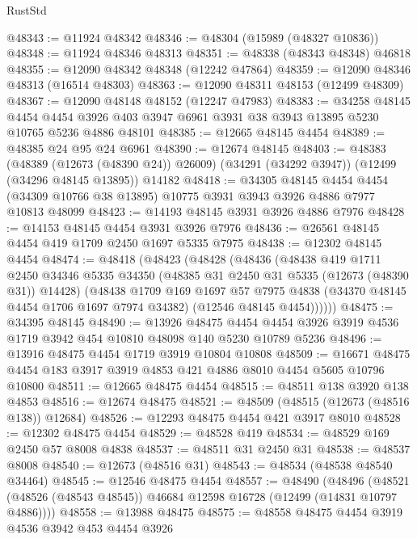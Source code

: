 \begin{lexlean}{RustStd}
\begin{coremodule}
@48343 := @11924 @48342
@48346 := @48304 (@15989 (@48327 @10836))
@48348 := @11924 @48346 @48313
@48351 := @48338 (@48343 @48348) @46818
@48355 := @12090 @48342 @48348 (@12242 @47864)
@48359 := @12090 @48346 @48313 (@16514 @48303)
@48363 := @12090 @48311 @48153 (@12499 @48309)
@48367 := @12090 @48148 @48152 (@12247 @47983)
@48383 := @34258
    @48145
    @4454
    @4454
    @3926
    @403
    @3947
    @6961
    @3931
    @38
    @3943
    @13895
    @5230
    @10765
    @5236
    @4886
    @48101
@48385 := @12665 @48145 @4454
@48389 := @48385 @24 @95 @24 @6961
@48390 := @12674 @48145
@48403 := @48383
    (@48389 (@12673 (@48390 @24)) @26009)
    (@34291 (@34292 @3947))
    (@12499 (@34296 @48145 @13895))
    @14182
@48418 := @34305
    @48145
    @4454
    @4454
    (@34309 @10766 @38 @13895)
    @10775
    @3931
    @3943
    @3926
    @4886
    @7977
    @10813
    @48099
@48423 := @14193 @48145 @3931 @3926 @4886 @7976
@48428 := @14153 @48145 @4454 @3931 @3926 @7976
@48436 := @26561 @48145 @4454 @419 @1709 @2450 @1697 @5335 @7975
@48438 := @12302 @48145 @4454
@48474 := @48418
    (@48423
      (@48428
        (@48436
          (@48438
            @419
            @1711
            @2450
            @34346
            @5335
            @34350
            (@48385 @31 @2450 @31 @5335 (@12673 (@48390 @31)) @14428)
            (@48438
              @1709
              @169
              @1697
              @57
              @7975
              @4838
              (@34370 @48145 @4454 @1706 @1697 @7974 @34382)
              (@12546 @48145 @4454))))))
@48475 := @34395 @48145
@48490 := @13926
    @48475
    @4454
    @4454
    @3926
    @3919
    @4536
    @1719
    @3942
    @454
    @10810
    @48098
    @140
    @5230
    @10789
    @5236
@48496 := @13916 @48475 @4454 @1719 @3919 @10804 @10808
@48509 := @16671 @48475 @4454 @183 @3917 @3919 @4853 @421 @4886 @8010 @4454 @5605 @10796 @10800
@48511 := @12665 @48475 @4454
@48515 := @48511 @138 @3920 @138 @4853
@48516 := @12674 @48475
@48521 := @48509 (@48515 (@12673 (@48516 @138)) @12684)
@48526 := @12293 @48475 @4454 @421 @3917 @8010
@48528 := @12302 @48475 @4454
@48529 := @48528 @419
@48534 := @48529 @169 @2450 @57 @8008 @4838
@48537 := @48511 @31 @2450 @31
@48538 := @48537 @8008
@48540 := @12673 (@48516 @31)
@48543 := @48534 (@48538 @48540 @34464)
@48545 := @12546 @48475 @4454
@48557 := @48490
    (@48496 (@48521 (@48526 (@48543 @48545)) @46684 @12598 @16728 (@12499 (@14831 @10797 @4886))))
@48558 := @13988 @48475
@48575 := @48558
    @48475
    @4454
    @3919
    @4536
    @3942
    @453
    @4454
    @3926

\end{coremodule}
\end{lexlean}

